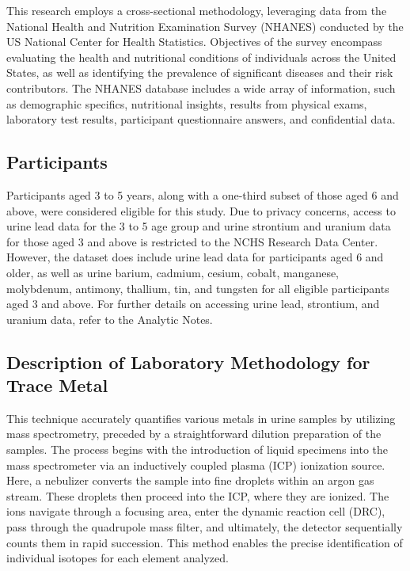 \documentclass[
  man]{apa6}
\begin{document}
This research employs a cross-sectional methodology, leveraging data from the National Health and Nutrition Examination Survey (NHANES) conducted by the US National Center for Health Statistics. Objectives of the survey encompass evaluating the health and nutritional conditions of individuals across the United States, as well as identifying the prevalence of significant diseases and their risk contributors. The NHANES database includes a wide array of information, such as demographic specifics, nutritional insights, results from physical exams, laboratory test results, participant questionnaire answers, and confidential data.

\hypertarget{participants}{%
\subsection{Participants}\label{participants}}

Participants aged 3 to 5 years, along with a one-third subset of those aged 6 and above, were considered eligible for this study. Due to privacy concerns, access to urine lead data for the 3 to 5 age group and urine strontium and uranium data for those aged 3 and above is restricted to the NCHS Research Data Center. However, the dataset does include urine lead data for participants aged 6 and older, as well as urine barium, cadmium, cesium, cobalt, manganese, molybdenum, antimony, thallium, tin, and tungsten for all eligible participants aged 3 and above. For further details on accessing urine lead, strontium, and uranium data, refer to the Analytic Notes.

\hypertarget{description-of-laboratory-methodology-for-trace-metal}{%
\subsection{Description of Laboratory Methodology for Trace Metal}\label{description-of-laboratory-methodology-for-trace-metal}}

This technique accurately quantifies various metals in urine samples by utilizing mass spectrometry, preceded by a straightforward dilution preparation of the samples. The process begins with the introduction of liquid specimens into the mass spectrometer via an inductively coupled plasma (ICP) ionization source. Here, a nebulizer converts the sample into fine droplets within an argon gas stream. These droplets then proceed into the ICP, where they are ionized. The ions navigate through a focusing area, enter the dynamic reaction cell (DRC), pass through the quadrupole mass filter, and ultimately, the detector sequentially counts them in rapid succession. This method enables the precise identification of individual isotopes for each element analyzed.
\end{document}
